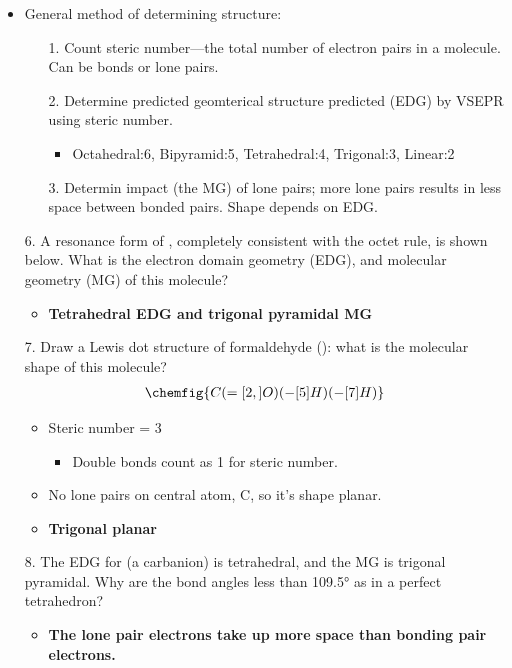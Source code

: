 \documentclass[12pt,a4paper]{article}
\begin{document}
\begin{itemize}
\begin{itemize}
        \end{itemize}
    \item General method of determining structure:
    \begin{itemize}
        \item[1.] Count steric number---the total number of electron pairs in a molecule. Can be bonds or lone pairs.
        \item[2.] Determine predicted geomterical structure predicted (EDG) by VSEPR using steric number.
            \begin{itemize}
                \item Octahedral:6, Bipyramid:5, Tetrahedral:4, Trigonal:3, Linear:2
            \end{itemize}
        \item[3.] Determin impact (the MG) of lone pairs; more lone pairs results in less space between bonded pairs. Shape depends on EDG.
    \end{itemize}
    \item[6.] A resonance form of , completely consistent with the octet rule,  is shown below.  What is the electron domain geometry (EDG), and molecular geometry (MG) of this molecule?
        \begin{itemize}
            \item \textbf{Tetrahedral EDG and trigonal pyramidal MG}
        \end{itemize}
    \item[7.] Draw a Lewis dot structure of formaldehyde (): what is the molecular shape of this molecule?
        \begin{align*}
            \chemfig{C(=[2,]O)(-[5]H)(-[7]H)}
        \end{align*}
        \begin{itemize}
            \item Steric number = 3
                \begin{itemize}
                    \item Double bonds count as 1 for steric number.
                \end{itemize}
            \item No lone pairs on central atom, C, so it's shape planar. 
            \item \textbf{Trigonal planar}
        \end{itemize}
    \item[8.] The EDG for  (a carbanion) is tetrahedral, and the MG is trigonal pyramidal.  Why are the  bond angles less than \ang{109.5} as in a perfect tetrahedron? 
        \begin{itemize}
            \item \textbf{The lone pair electrons take up more space than bonding pair electrons.}
        \end{itemize}
\end{itemize}
\end{document}
